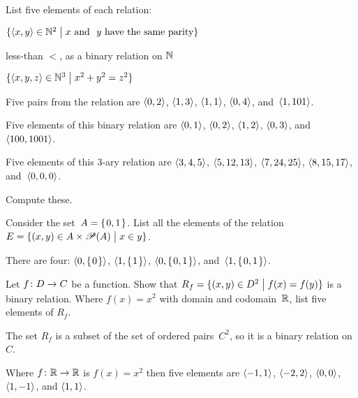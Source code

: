 \documentclass{ibl}  %
\begin{document}

\begin{problem}
List five elements of each relation:
\begin{items}
\item $\{\langle x,y\rangle\in \mathbb{N}^2 \bigm| 
     \text{$x$ and ~$y$ have the same parity}\}$
\item less-than $<$, as a binary relation on $\mathbb{N}$
\item $\{\langle x,y,z\rangle\in\mathbb{N}^3 \bigm| x^2+y^2=z^2\}$
\end{items}
\begin{answer}
\begin{items}
\item Five pairs from the relation are
  $\langle0,2\rangle$, $\langle1,3\rangle$, $\langle1,1\rangle$, 
  $\langle0,4\rangle$, 
 and~$\langle1,101\rangle$.    
\item Five elements of this binary relation are 
  $\langle0,1\rangle$, $\langle0,2\rangle$, $\langle1,2\rangle$, $\langle0,3\rangle$,
  and~$\langle100,1001\rangle$. 
\item Five elements of this $3$-ary relation are
  $\langle3,4,5\rangle$, $\langle5,12,13\rangle$, $\langle7,24,25\rangle$, 
  $\langle8,15,17\rangle$, and~$\langle0,0,0\rangle$.
\end{items}
\end{answer}
\end{problem}

\begin{problem}
Compute these.
\begin{exes}
\begin{exercise}
  Consider the set~$A=\mbox{$\{\hspace{0.1em}0,1\hspace{0.1em}\}$}$.
  List all the elements of the relation 
  $E=\{(x,y)\in A\times\mathscr{P}(A) \bigm| x\in y\}$.
\end{exercise}
\begin{answer}
  There are four: $\langle0,\mbox{$\{\hspace{0.1em}0\hspace{0.1em}\}$}\rangle$, 
  $\langle1,\mbox{$\{\hspace{0.1em}1\hspace{0.1em}\}$}\rangle$, $\langle0,\mbox{$\{\hspace{0.1em}0,1\hspace{0.1em}\}$}\rangle$, 
  and~$\langle1,\mbox{$\{\hspace{0.1em}0,1\hspace{0.1em}\}$}\rangle$.   
\end{answer}
\begin{exercise} 
  Let $\mbox{$f\colon D\to C$}$ be a function.
  Show that 
  $R_f=\{(x,y)\in D^2 \bigm| f(x)=f(y)\}$
  is a binary relation.
  Where $f(x)=x^2$ with domain and codomain~$\mathbb{R}$,
  list five elements of $R_f$. 
\end{exercise}
\begin{answer}
  The set $R_f$ is a subset of the set of ordered pairs~$C^2$,
  so it is a binary relation on~$C$.

  Where $\mbox{$f\colon \mathbb{R}\to \mathbb{R}$}$ is $f(x)=x^2$ then five elements are
  $\langle-1,1\rangle$, $\langle-2,2\rangle$, $\langle0,0\rangle$,
  $\langle1,-1\rangle$, and $\langle1,1\rangle$.  
\end{answer}
\end{exes}
\end{problem}
\end{document}
